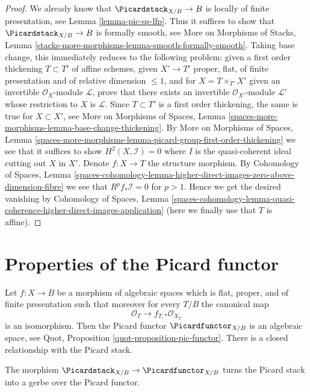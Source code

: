 \begin{proof}
We already know that $\Picardstack_{X/B} \to B$ is
locally of finite presentation, see Lemma \ref{lemma-pic-qs-lfp}.
Thus it suffices to show that $\Picardstack_{X/B} \to B$ is
formally smooth, see More on Morphisms of Stacks, Lemma
\ref{stacks-more-morphisms-lemma-smooth-formally-smooth}.
Taking base change, this immediately reduces to the following
problem: given a first order thickening $T \subset T'$
of affine schemes, given $X' \to T'$ proper, flat, of finite
presentation and of relative dimension $\leq 1$, and
for $X = T \times_{T'} X'$ given an invertible $\mathcal{O}_X$-module
$\mathcal{L}$, prove that there exists an invertible
$\mathcal{O}_{X'}$-module $\mathcal{L}'$ whose
restriction to $X$ is $\mathcal{L}$.
Since $T \subset T'$ is a first order thickening, the
same is true for $X \subset X'$, see
More on Morphisms of Spaces, Lemma
\ref{spaces-more-morphisms-lemma-base-change-thickening}.
By More on Morphisms of Spaces, Lemma
\ref{spaces-more-morphisms-lemma-picard-group-first-order-thickening}
we see that it suffices to show $H^2(X, \mathcal{I}) = 0$
where $I$ is the quasi-coherent ideal cutting out $X$ in $X'$.
Denote $f : X \to T$ the structure morphism.
By Cohomology of Spaces, Lemma
\ref{spaces-cohomology-lemma-higher-direct-images-zero-above-dimension-fibre}
we see that $R^pf_*\mathcal{I} = 0$ for $p > 1$.
Hence we get the desired vanishing by
Cohomology of Spaces, Lemma
\ref{spaces-cohomology-lemma-quasi-coherence-higher-direct-images-application}
(here we finally use that $T$ is affine).
\end{proof}




\section{Properties of the Picard functor}
\label{section-picard-functor}

\noindent
Let $f : X \to B$ be a morphism of algebraic spaces which is flat,
proper, and of finite presentation such that moreover for every $T/B$
the canonical map
$$
\mathcal{O}_T \longrightarrow f_{T, *}\mathcal{O}_{X_T}
$$
is an isomorphism. Then the Picard functor $\Picardfunctor_{X/B}$ is an
algebraic space, see Quot, Proposition \ref{quot-proposition-pic-functor}.
There is a closed relationship with the Picard stack.

\begin{lemma}
\label{lemma-pic-gerbe-over-pic-functor}
The morphism $\Picardstack_{X/B} \to \Picardfunctor_{X/B}$
turns the Picard stack into a gerbe over the Picard functor.
\end{lemma}

